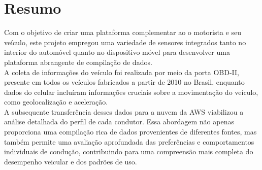 \chapter*{Resumo}

\noindent Com o objetivo de criar uma plataforma complementar ao o motorista e seu veículo, este projeto empregou uma variedade de sensores integrados tanto no interior do automóvel quanto no dispositivo móvel para desenvolver uma plataforma abrangente de compilação de dados.\\ 
A coleta de informações do veículo foi realizada por meio da porta OBD-II, presente em todos os veículos fabricados a partir de 2010 no Brasil, enquanto dados do celular incluíram informações cruciais sobre a movimentação do veículo, como geolocalização e aceleração.\\
A subsequente transferência desses dados para a nuvem da AWS viabilizou a análise detalhada do perfil de cada condutor. Essa abordagem não apenas proporciona uma compilação rica de dados provenientes de diferentes fontes, mas também permite uma avaliação aprofundada das preferências e comportamentos individuais de condução, contribuindo para uma compreensão mais completa do desempenho veicular e dos padrões de uso.

